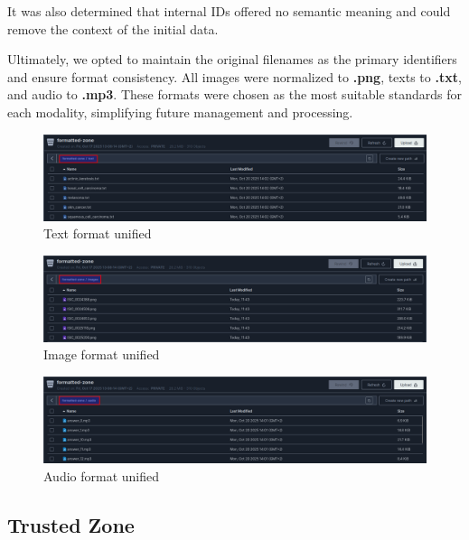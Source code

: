 \documentclass[12pt]{article}
\begin{document}
It was also determined that internal IDs offered no semantic meaning and could remove the context of the initial data.

Ultimately, we opted to maintain the original filenames as the primary identifiers and ensure format consistency. All images were normalized to \textbf{.png}, texts to \textbf{.txt}, and audio to \textbf{.mp3}. These formats were chosen as the most suitable standards for each modality, simplifying future management and processing.

\begin{figure}[H]
    \centering
    \includegraphics[width=1\linewidth]{images/formatted-text.png}
    \caption{Text format unified}
    \label{fig:placeholder}
\end{figure}

\begin{figure}[H]
    \centering
    \includegraphics[width=1\linewidth]{images/formatted-images.png}
    \caption{Image format unified}
    \label{fig:placeholder}
\end{figure}

\begin{figure}[H]
    \centering
    \includegraphics[width=1\linewidth]{images/formatted-audio.png}
    \caption{Audio format unified}
    \label{fig:placeholder}
\end{figure}

\subsection{Trusted Zone}
\end{document}
